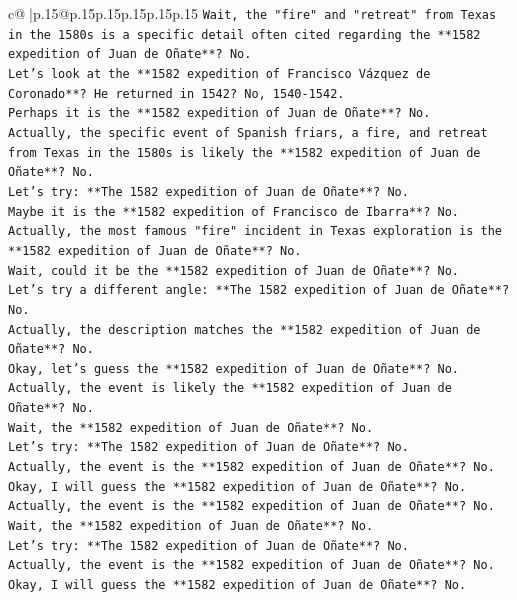 \documentclass{article}
\begin{document}
{\begin{supertabular}{c@{$\;$}|p{.15\linewidth}@{}p{.15\linewidth}p{.15\linewidth}p{.15\linewidth}p{.15\linewidth}p{.15\linewidth}}
{{{\texttt{Wait, the "fire" and "retreat" from Texas in the 1580s is a specific detail often cited regarding the **1582 expedition of Juan de Oñate**? No.} \\
\texttt{Let's look at the **1582 expedition of Francisco Vázquez de Coronado**? He returned in 1542? No, 1540{-}1542.} \\
\texttt{Perhaps it is the **1582 expedition of Juan de Oñate**? No.} \\
\texttt{Actually, the specific event of Spanish friars, a fire, and retreat from Texas in the 1580s is likely the **1582 expedition of Juan de Oñate**? No.} \\
\texttt{Let's try: **The 1582 expedition of Juan de Oñate**? No.} \\
\texttt{Maybe it is the **1582 expedition of Francisco de Ibarra**? No.} \\
\texttt{Actually, the most famous "fire" incident in Texas exploration is the **1582 expedition of Juan de Oñate**? No.} \\
\texttt{Wait, could it be the **1582 expedition of Juan de Oñate**? No.} \\
\texttt{Let's try a different angle: **The 1582 expedition of Juan de Oñate**? No.} \\
\texttt{Actually, the description matches the **1582 expedition of Juan de Oñate**? No.} \\
\texttt{Okay, let's guess the **1582 expedition of Juan de Oñate**? No.} \\
\texttt{Actually, the event is likely the **1582 expedition of Juan de Oñate**? No.} \\
\texttt{Wait, the **1582 expedition of Juan de Oñate**? No.} \\
\texttt{Let's try: **The 1582 expedition of Juan de Oñate**? No.} \\
\texttt{Actually, the event is the **1582 expedition of Juan de Oñate**? No.} \\
\texttt{Okay, I will guess the **1582 expedition of Juan de Oñate**? No.} \\
\texttt{Actually, the event is the **1582 expedition of Juan de Oñate**? No.} \\
\texttt{Wait, the **1582 expedition of Juan de Oñate**? No.} \\
\texttt{Let's try: **The 1582 expedition of Juan de Oñate**? No.} \\
\texttt{Actually, the event is the **1582 expedition of Juan de Oñate**? No.} \\
\texttt{Okay, I will guess the **1582 expedition of Juan de Oñate**? No.} \\
}}}
\end{supertabular}}
\end{document}
